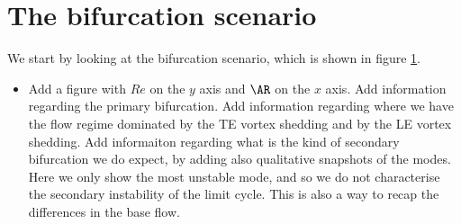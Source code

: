 \section{The bifurcation scenario}

We start by looking at the bifurcation scenario, which is shown in figure \ref{}.

\begin{itemize}
  \item Add a figure with $Re$ on the $y$ axis and $\AR$ on the $x$ axis. Add information regarding the primary bifurcation. Add information regarding where we have the flow regime dominated by the TE vortex shedding and by the LE vortex shedding. Add informaiton regarding what is the kind of secondary bifurcation we do expect, by adding also qualitative snapshots of the modes. Here we only show the most unstable mode, and so we do not characterise the secondary instability of the limit cycle. This is also a way to recap the differences in the base flow. 
\end{itemize}

